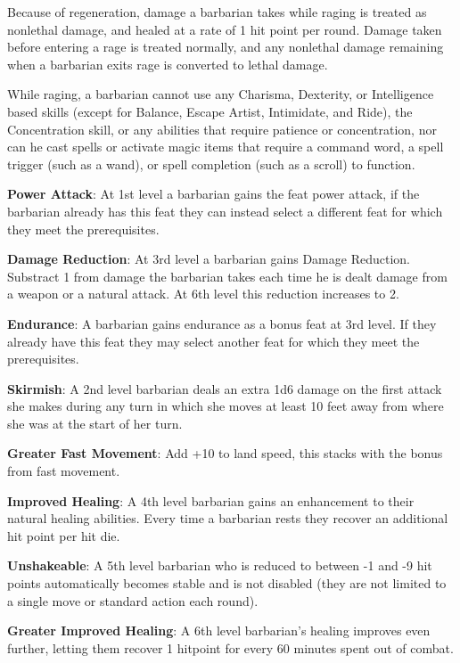 Because of regeneration, damage a barbarian takes while raging is treated as nonlethal damage, and healed at a rate of 1 hit point per round. Damage taken before entering a rage is treated normally, and any nonlethal damage remaining when a barbarian exits rage is converted to lethal damage.

While raging, a barbarian cannot use any Charisma, Dexterity, or Intelligence based skills (except for Balance, Escape Artist, Intimidate, and Ride), the Concentration skill, or any abilities that require patience or concentration, nor can he cast spells or activate magic items that require a command word, a spell trigger (such as a wand), or spell completion (such as a scroll) to function.

\textbf{Power Attack}: At 1st level a barbarian gains the feat power attack, if the barbarian already has this feat they can instead select a different feat for which they meet the prerequisites.

\textbf{Damage Reduction}: At 3rd level a barbarian gains Damage Reduction. Substract 1 from damage the barbarian takes each time he is dealt damage from a weapon or a natural attack. At 6th level this reduction increases to 2.

\textbf{Endurance}: A barbarian gains endurance as a bonus feat at 3rd level. If they already have this feat they may select another feat for which they meet the prerequisites. 

\textbf{Skirmish}: A 2nd level barbarian deals an extra 1d6 damage on the first attack she makes during any turn in which she moves at least 10 feet away from where she was at the start of her turn. 

\textbf{Greater Fast Movement}: Add +10 to land speed, this stacks with the bonus from fast movement.

\textbf{Improved Healing}: A 4th level barbarian gains an enhancement to their natural healing abilities. Every time a barbarian rests they recover an additional hit point per hit die. 

\textbf{Unshakeable}: A 5th level barbarian who is reduced to between -1 and -9 hit points automatically becomes stable and is not disabled (they are not limited to a single move or standard action each round). 

\textbf{Greater Improved Healing}: A 6th level barbarian's healing improves even further, letting them recover 1 hitpoint for every 60 minutes spent out of combat. 
